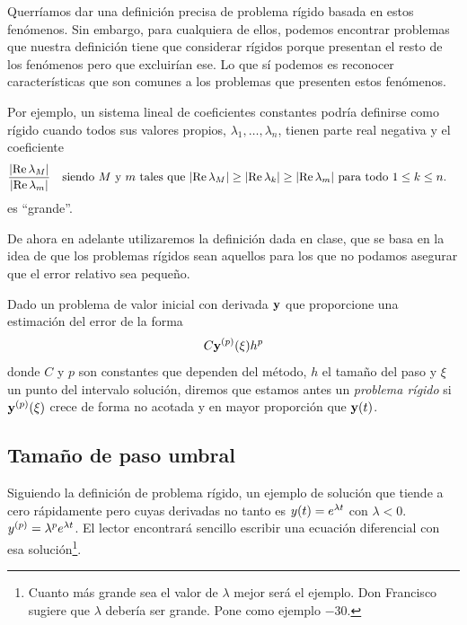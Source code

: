 Querríamos dar una definición precisa de problema rígido
basada en estos fenómenos.
Sin embargo, para cualquiera de ellos, podemos encontrar problemas
que nuestra definición tiene que considerar rígidos porque
presentan el resto de los fenómenos
pero que excluirían ese.
Lo que sí podemos es reconocer características que son comunes
a los problemas que presenten estos fenómenos.

Por ejemplo,
un sistema lineal de coeficientes constantes podría definirse como rígido
cuando todos sus valores propios, $\lambda_1,\ldots,\lambda_n$,
tienen parte real negativa y el coeficiente
\begin{equation*}
    \frac{\abs{\Re\lambda_M}}{\abs{\Re\lambda_m}}
    \qq{siendo $M$ y $m$ tales que
    $\abs{\Re\lambda_M} \ge \abs{\Re\lambda_k} \ge \abs{\Re\lambda_m}$
    para todo $1 \le k \le n$.}
\end{equation*}
es ``grande''.

De ahora en adelante utilizaremos la definición dada en clase,
que se basa en la idea de que los problemas rígidos sean aquellos
para los que no podamos asegurar que el error relativo sea pequeño.

\begin{definition}
    Dado un problema de valor inicial con derivada $\vb{y}{}$
    que proporcione una estimación del error de la forma
    \begin{equation*}
        C\vb{y}{}^{(p)}(\xi)h^p
    \end{equation*}
    donde $C$ y $p$ son constantes que dependen del método,
    $h$ el tamaño del paso y $\xi$ un punto del intervalo solución,
    diremos que estamos antes un \emph{problema rígido} si
    $\vb{y}{}^{(p)}(\xi)$ crece de forma no acotada
    y en mayor proporción que $\vb{y}{}(t)$.
\end{definition}

\subsection{Tamaño de paso umbral}

Siguiendo la definición de problema rígido,
un ejemplo de solución que tiende a cero rápidamente
pero cuyas derivadas no tanto es
$y(t) = e^{\lambda t}$ con $\lambda < 0$.
$y^{(p)} = \lambda^pe^{\lambda t}$.
El lector encontrará sencillo
escribir una ecuación diferencial con esa solución\footnote{
    Cuanto más grande sea el valor de $\lambda$ mejor será el ejemplo.
    Don Francisco sugiere que $\lambda$ debería ser grande.
    Pone como ejemplo $-30$.
}.

